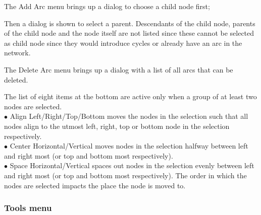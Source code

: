 \begin{center}
\end{center}

The Add Arc menu brings up a dialog to choose a child node first;

\begin{center}
\end{center}

Then a dialog is shown to select a parent. Descendants of the child
node, parents of the child node and the node itself are not listed since
these cannot be selected as child node since they would introduce cycles
or already have an arc in the network.

\begin{center}
\end{center}

The Delete Arc menu brings up a dialog with a list of all arcs that
can be deleted.

\begin{center}
\end{center}

The list of eight items at the bottom are active only when a group of at least
two nodes are selected.\\
$\bullet$ Align Left/Right/Top/Bottom moves the nodes in the selection such
that all nodes align to the utmost left, right, top or bottom node in the
selection respectively.\\
$\bullet$ Center Horizontal/Vertical moves nodes in the selection halfway
between left and right most (or top and bottom most respectively).\\
$\bullet$ Space Horizontal/Vertical spaces out nodes in the selection evenly
between left and right most (or top and bottom most respectively). The order
in which the nodes are selected impacts the place the node is moved to.\\

\subsubsection*{Tools menu}

\begin{center}
\end{center}


